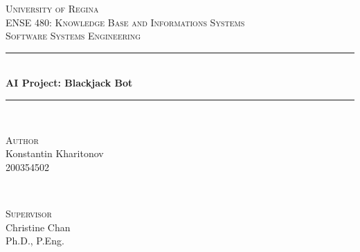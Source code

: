 \begin{titlepage} %
	\newcommand{\HRule}{\rule{\linewidth}{0.5mm}} %
	
	\center %
	
	
	\textsc{\Huge University of Regina}\\[1.5cm] %

	\textsc{\Large ENSE 480: Knowledge Base and Informations Systems }\\[0.5cm]
	
	\textsc{\Large Software Systems Engineering}\\[0.5cm] %
	
	
	
	
	
	\HRule\\[0.4cm]
	
	{\Huge\bfseries AI Project: Blackjack Bot}\\[0.4cm] %
	
	\HRule\\[1.5cm]
	
	
	\begin{minipage}[t]{0.4\textwidth}
		\begin{flushleft}
			\large
			\textsc{Author}\\
			Konstantin Kharitonov\\
			\textsc{200354502} %
		\end{flushleft}
		
	\end{minipage}
	~
	\begin{minipage}[t]{0.4\textwidth}
		\begin{flushright}
			\large
			\textsc{Supervisor}\\ %
			Christine Chan\\
			Ph.D., P.Eng.\\
		\end{flushright}
	\end{minipage}
	

\end{titlepage}
